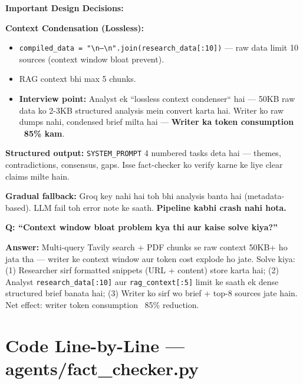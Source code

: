 \documentclass[11pt, a4paper]{article}
\begin{document}
\begin{codestorybox}
\textbf{Important Design Decisions:}

\textbf{Context Condensation (Lossless):}
\begin{itemize}
\item \texttt{compiled\_data = "\textbackslash n---\textbackslash n".join(research\_data[:10])} --- raw data limit 10 sources (context window bloat prevent).
\item RAG context bhi max 5 chunks.
\item \textbf{Interview point:} Analyst ek ``lossless context condenser`` hai --- 50KB raw data ko 2-3KB structured analysis mein convert karta hai. Writer ko raw dumps nahi, condensed brief milta hai --- \textbf{Writer ka token consumption ~85\% kam}.
\end{itemize}

\textbf{Structured output:} \texttt{SYSTEM\_PROMPT} 4 numbered tasks deta hai --- themes, contradictions, consensus, gaps. Isse fact-checker ko verify karne ke liye clear claims milte hain.

\textbf{Gradual fallback:} Groq key nahi hai toh bhi analysis banta hai (metadata-based). LLM fail toh error note ke saath. \textbf{Pipeline kabhi crash nahi hota.}
\end{codestorybox}

\begin{interviewbox}
\textbf{Q: ``Context window bloat problem kya thi aur kaise solve kiya?''}

\textbf{Answer:} Multi-query Tavily search + PDF chunks se raw context 50KB+ ho jata tha --- writer ke context window aur token cost explode ho jate. Solve kiya: (1) Researcher sirf formatted snippets (URL + content) store karta hai; (2) Analyst \texttt{research\_data[:10]} aur \texttt{rag\_context[:5]} limit ke saath ek dense structured brief banata hai; (3) Writer ko sirf wo brief + top-8 sources jate hain. Net effect: writer token consumption ~85\% reduction.
\end{interviewbox}

\newpage

\section{Code Line-by-Line --- agents/fact\_checker.py}
\end{document}
